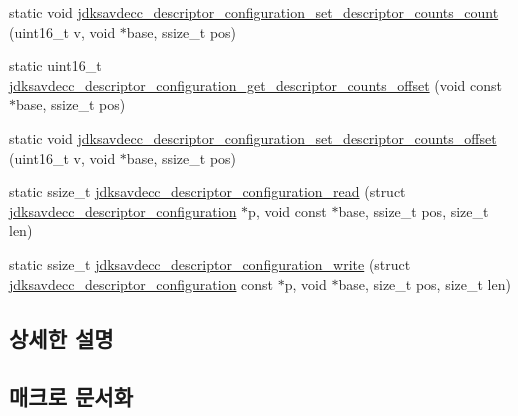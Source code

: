 \begin{DoxyCompactItemize}
\item 
static void \hyperlink{group__descriptor__configuration_ga95664658d63b1969c366223dadfbf071}{jdksavdecc\+\_\+descriptor\+\_\+configuration\+\_\+set\+\_\+descriptor\+\_\+counts\+\_\+count} (uint16\+\_\+t v, void $\ast$base, ssize\+\_\+t pos)
\item 
static uint16\+\_\+t \hyperlink{group__descriptor__configuration_gaa8e16a0d5ab45bd75106b222966faac7}{jdksavdecc\+\_\+descriptor\+\_\+configuration\+\_\+get\+\_\+descriptor\+\_\+counts\+\_\+offset} (void const $\ast$base, ssize\+\_\+t pos)
\item 
static void \hyperlink{group__descriptor__configuration_gae51fa62f1486319812401b14b291ecd0}{jdksavdecc\+\_\+descriptor\+\_\+configuration\+\_\+set\+\_\+descriptor\+\_\+counts\+\_\+offset} (uint16\+\_\+t v, void $\ast$base, ssize\+\_\+t pos)
\item 
static ssize\+\_\+t \hyperlink{group__descriptor__configuration_ga642c12595cf133702c5eebe1b98cea18}{jdksavdecc\+\_\+descriptor\+\_\+configuration\+\_\+read} (struct \hyperlink{structjdksavdecc__descriptor__configuration}{jdksavdecc\+\_\+descriptor\+\_\+configuration} $\ast$p, void const $\ast$base, ssize\+\_\+t pos, size\+\_\+t len)
\item 
static ssize\+\_\+t \hyperlink{group__descriptor__configuration_gac2652eee3241c968c2c583068a5f8d5a}{jdksavdecc\+\_\+descriptor\+\_\+configuration\+\_\+write} (struct \hyperlink{structjdksavdecc__descriptor__configuration}{jdksavdecc\+\_\+descriptor\+\_\+configuration} const $\ast$p, void $\ast$base, size\+\_\+t pos, size\+\_\+t len)
\end{DoxyCompactItemize}


\subsection{상세한 설명}


\subsection{매크로 문서화}
